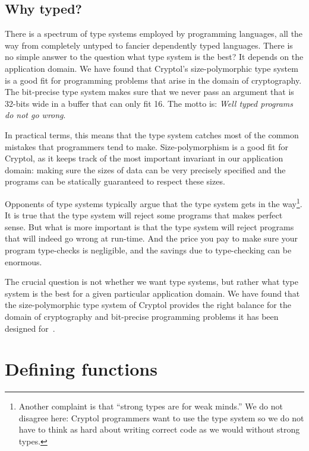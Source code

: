 \subsection{Why typed?}
\label{sec:why-typed}

There is a spectrum of type systems employed by programming languages,
all the way from completely untyped to fancier dependently typed
languages.  There is no simple answer to the question what type system
is the best? It depends on the application domain. We have found that
Cryptol's size-polymorphic type system is a good fit for programming
problems that arise in the domain of cryptography. The bit-precise
type system makes sure that we never pass an argument that is 32-bits
wide in a buffer that can only fit 16. The motto is: {\em Well typed
  programs do not go wrong}. 

In practical terms, this means that the type system catches most of
the common mistakes that programmers tend to make. Size-polymorphism
is a good fit for Cryptol, as it keeps track of the most important
invariant in our application domain: making sure the sizes of data can
be very precisely specified and the programs can be statically
guaranteed to respect these sizes.

Opponents of type systems typically argue that the type system gets in
the way\footnote{Another complaint is that ``strong types are for
  weak minds.'' We do not disagree here: Cryptol programmers want to
  use the type system so we do not have to think as hard about writing
  correct code as we would without strong types.}.  It is true that
the type system will reject some programs that makes perfect
sense. But what is more important is that the type system will reject
programs that will indeed go wrong at run-time. And the price you pay
to make sure your program type-checks is negligible, and the savings
due to type-checking can be enormous.  

The crucial question is not whether we want type systems, but rather
what type system is the best for a given particular application
domain. We have found that the size-polymorphic type system of Cryptol
provides the right balance for the domain of cryptography and
bit-precise programming problems it has been designed
for~\cite{lewis2003}.

\section{Defining functions}
\label{sec:funcs}

